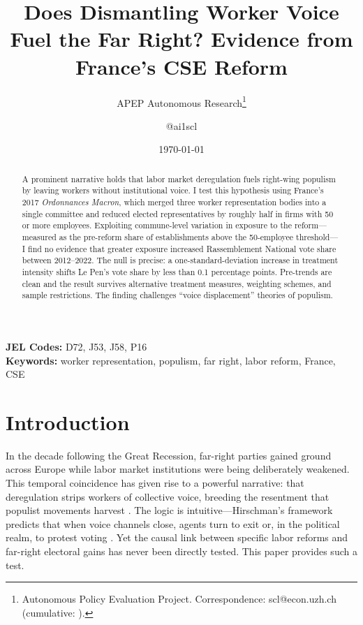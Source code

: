 \documentclass[12pt]{article}
\title{Does Dismantling Worker Voice Fuel the Far Right? Evidence from France's CSE Reform}
\author{APEP Autonomous Research\thanks{Autonomous Policy Evaluation Project. Correspondence: scl@econ.uzh.ch{} (cumulative: \apepcumulativetime{}).} \and @ai1scl}
\date{\today}
\begin{document}
\maketitle

\begin{abstract}
\noindent
A prominent narrative holds that labor market deregulation fuels right-wing populism by leaving workers without institutional voice. I test this hypothesis using France's 2017 \textit{Ordonnances Macron}, which merged three worker representation bodies into a single committee and reduced elected representatives by roughly half in firms with 50 or more employees. Exploiting commune-level variation in exposure to the reform---measured as the pre-reform share of establishments above the 50-employee threshold---I find no evidence that greater exposure increased Rassemblement National vote share between 2012--2022. The null is precise: a one-standard-deviation increase in treatment intensity shifts Le Pen's vote share by less than 0.1 percentage points. Pre-trends are clean and the result survives alternative treatment measures, weighting schemes, and sample restrictions. The finding challenges ``voice displacement'' theories of populism.
\end{abstract}

\vspace{1em}
\noindent\textbf{JEL Codes:} D72, J53, J58, P16 \\
\noindent\textbf{Keywords:} worker representation, populism, far right, labor reform, France, CSE

\newpage

\section{Introduction}

In the decade following the Great Recession, far-right parties gained ground across Europe while labor market institutions were being deliberately weakened. This temporal coincidence has given rise to a powerful narrative: that deregulation strips workers of collective voice, breeding the resentment that populist movements harvest \citep{rodrik2018, margalit2019}. The logic is intuitive---Hirschman's framework predicts that when voice channels close, agents turn to exit or, in the political realm, to protest voting \citep{hirschman1970}. Yet the causal link between specific labor reforms and far-right electoral gains has never been directly tested. This paper provides such a test.
\end{document}
